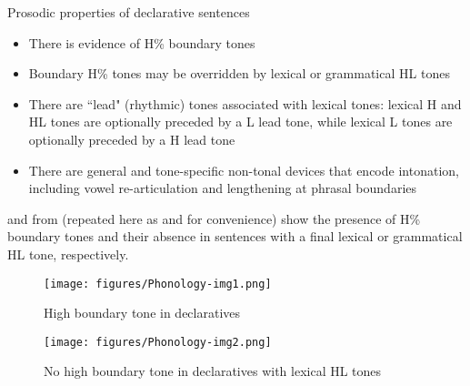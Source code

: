 
\ea\label{ex:14:intonation of declaratives}
{Prosodic properties of declarative sentences}

\begin{itemize}
    \item There is evidence of H\% boundary tones\\
    \item Boundary H\% tones may be overridden by lexical or grammatical HL tones\\
    \item There are ``lead" (rhythmic) tones associated with lexical tones: lexical H and HL tones are optionally preceded by a L lead tone, while lexical L tones are optionally preceded by a H lead tone \parencite{garellek2015lexical}\\ %
    \item There are general and tone-specific non-tonal devices that encode intonation, including vowel re-articulation and lengthening at phrasal boundaries \parencite{aguilar2015multi, caballero2014tone}\\
\end{itemize}
\z

 and  from  (repeated here as  and  for  convenience) show the presence of H\% boundary tones and their absence in sentences with a final lexical or grammatical HL tone, respectively.


\begin{figure}
\texttt{[image: figures/Phonology-img1.png]}
\caption{
\label{fig: H boundary tone in declaratives 3}
High boundary tone in declaratives \parencite{garellek2015lexical}}
\end{figure}

\begin{figure}
\texttt{[image: figures/Phonology-img2.png]}
\caption{
\label{fig: no H boundary tone in declaratives with lexical HL tones 3}
No high boundary tone in declaratives with lexical HL tones \parencite{garellek2015lexical}}
\end{figure}

